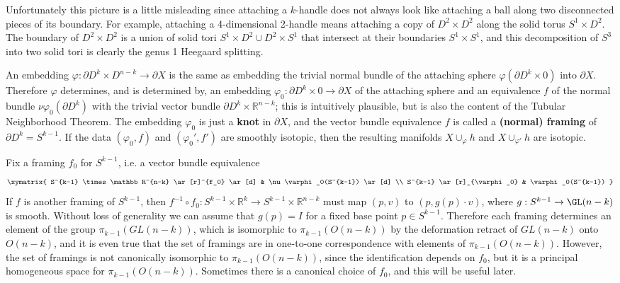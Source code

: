 Unfortunately this picture is a little misleading since attaching a $k$-handle does not always look like attaching a ball along two disconnected pieces of its boundary. For example, attaching a 4-dimensional 2-handle means attaching a copy of $D^2 \times D^2$ along the solid torus $S^1 \times D^2$. The boundary of $D^2 \times D^2$ is a union of solid tori $S^1 \times D^2 \cup D^2 \times S^1$ that intersect at their boundaries $S^1 \times S^1$, and this decomposition of $S^3$ into two solid tori is clearly the genus 1 Heegaard splitting.




An embedding $\varphi : \partial D^k \times D^{n-k} \rightarrow \partial X$ is the same as embedding the trivial normal bundle of the attaching sphere $\varphi(\partial D^k \times 0)$ into $\partial X$. Therefore $\varphi$ determines, and is determined by, an embedding $\varphi_0 : \partial D^k \times 0 \rightarrow \partial X$ of the attaching sphere and an equivalence $f$ of the normal bundle $\nu \varphi_0(\partial D^k)$ with the trivial vector bundle $\partial D^k \times \mathbb R^{n-k}$; this is intuitively plausible, but is also the content of the Tubular Neighborhood Theorem. The embedding $\varphi_0$ is just a \textbf{knot} in $\partial X$, and the vector bundle equivalence $f$ is called a \textbf{(normal) framing} of $\partial D^k = S^{k-1}$. If the data $(\varphi_0,f)$ and $(\varphi_0',f')$ are smoothly isotopic, then the resulting manifolds $X \cup_\varphi h$ and $X \cup_{\varphi'} h$ are isotopic. 

Fix a framing $f_0$ for $S^{k-1}$, i.e. a vector bundle equivalence
\[
\xymatrix
{
	S^{k-1} \times \mathbb R^{n-k} \ar[r]^{f_0} \ar[d] & \nu \varphi_0(S^{k-1}) \ar[d] \\
	S^{k-1} \ar[r]_{\varphi_0} & \varphi_0(S^{k-1})
}
\]
If $f$ is another framing of $S^{k-1}$, then $f^{-1} \circ f_0 : S^{k-1} \times \mathbb R^k \rightarrow S^{k-1} \times \mathbb R^{n-k}$ must map $(p,v)$ to $(p,g(p) \cdot v)$, where $g : S^{k-1} \rightarrow \GL(n-k)$ is smooth. Without loss of generality we can assume that $g(p) = I$ for a fixed base point $p \in S^{k-1}$. Therefore each framing determines an element of the group $\pi_{k-1}(GL(n-k))$, which is isomorphic to $\pi_{k-1}(O(n-k))$ by the deformation retract of $GL(n-k)$ onto $O(n-k)$, and it is even true that the set of framings are in one-to-one correspondence with elements of $\pi_{k-1}(O(n-k))$. However, the set of framings is not canonically isomorphic to $\pi_{k-1}(O(n-k))$, since the identification depends on $f_0$, but it is a principal homogeneous space for $\pi_{k-1}(O(n-k))$. Sometimes there is a canonical choice of $f_0$, and this will be useful later.

